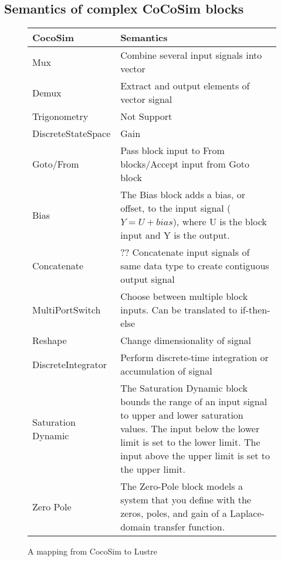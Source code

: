 \documentclass{llncs}
\begin{document}
\subsection{Semantics of complex CoCoSim blocks}

\begin{figure}[t]
\centering
{
\begin{tabular}{lp{5cm}}
\hline
\textbf{CocoSim} & \textbf{Semantics}  \\
\hline

Mux &
Combine several input signals into vector
\\


Demux &
Extract and output elements of vector signal
\\

Trigonometry &
Not Support
\\

DiscreteStateSpace &
Gain
\\

Goto/From &
Pass block input to From blocks/Accept input from Goto block
\\

Bias &
The Bias block adds a bias, or offset, to the input signal ($Y = U + bias$), where U is the block input and Y is the output.
\\

Concatenate &
?? Concatenate input signals of same data type to create contiguous output signal
\\

MultiPortSwitch &
Choose between multiple block inputs. Can be translated to if-then-else
\\

Reshape &
Change dimensionality of signal
\\

DiscreteIntegrator &
Perform discrete-time integration or accumulation of signal
\\

Saturation Dynamic &
The Saturation Dynamic block bounds the range of an input signal to upper and lower saturation values. The input below the lower limit is set to the lower limit. The input above the upper limit is set to the upper limit.
\\

Zero Pole &
The Zero-Pole block models a system that you define with the zeros, poles, and gain of a Laplace-domain transfer function. 
\\

\hline
\end{tabular}
}
\caption{A mapping from CocoSim to Lustre}
\label{mapping}
\end{figure}
\end{document}
